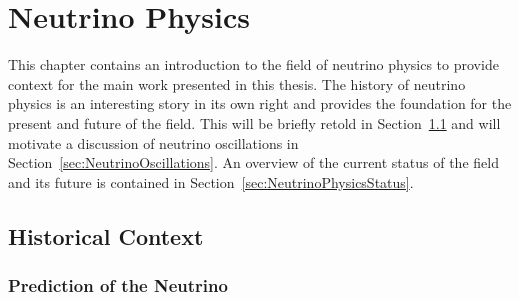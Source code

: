 
\graphicspath{{NeutrinoPhysics/Figs/}}

\chapter{Neutrino Physics}\label{chap:NeutrinoPhysics}

This chapter contains an introduction to the field of neutrino physics to provide context for the main work presented in this thesis.  The history of neutrino physics is an interesting story in its own right and provides the foundation for the present and future of the field.  This will be briefly retold in Section~\ref{sec:HistoricalContext} and will motivate a discussion of neutrino oscillations in Section~\ref{sec:NeutrinoOscillations}.  An overview of the current status of the field and its future is contained in Section~\ref{sec:NeutrinoPhysicsStatus}.

\section{Historical Context}\label{sec:HistoricalContext}

\subsection{Prediction of the Neutrino}\label{NeutrinoPrediction}

